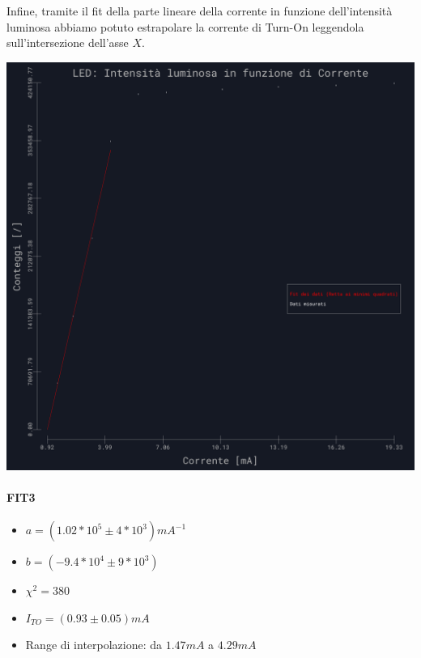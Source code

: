 \documentclass{article}
\begin{document}
Infine, tramite il fit della parte lineare della corrente in funzione dell'intensità luminosa abbiamo potuto estrapolare la corrente di Turn-On leggendola sull'intersezione dell'asse $X$.

\begin{center}
    \begin{minipage}{.6\textwidth} %
        \centering
        \includegraphics[width=\linewidth]{../images/grafico9.png} %
        \label{grafico9}
    \end{minipage}
    \hfill
    \begin{minipage}{0.35\textwidth} %
        \paragraph{FIT3}
        \begin{itemize}
            \item $a=( 1.02*10^{5}\pm4 * 10^3 )mA^{-1}$
            \item $b=(-9.4*10^4\pm 9*10^3)  $
            \item $\chi^2=380$
            \item $I_{TO}=(0.93\pm0.05 )mA$
            \item Range di interpolazione: da $1.47 mA$ a $4.29 mA$
        \end{itemize}
    \end{minipage}
    \hfill %
\end{center}
\end{document}
